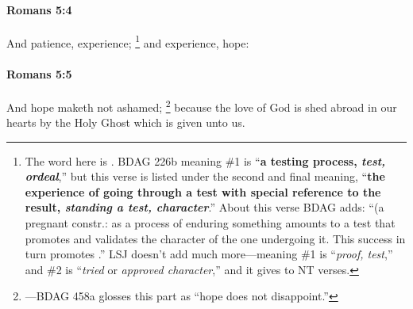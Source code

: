 		\paragraph{Romans 5:4} %
			\label{ROMANS-5-4}

			And patience, experience;%
				\footnote{%
					The word here is . BDAG 226b meaning \#1 is ``\textbf{a testing process, \textit{test, ordeal}},'' but this verse is listed under the second and final meaning, ``\textbf{the experience of going through a test with special reference to the result, \textit{standing a test, character}}.'' About this verse BDAG adds: ``(a pregnant constr.:  as a process of enduring something amounts to a test that promotes and validates the character of the one undergoing it. This success in turn promotes .'' LSJ doesn't add much more---meaning \#1 is ``\textit{proof, test},'' and \#2 is ``\textit{tried} or \textit{approved character},'' and it gives to NT verses.
					}
			and experience, hope:

			\begin{framed}
			\scriptsize
				\begin{compactdesc}
					\item[SBLG] 
				\end{compactdesc}
			\end{framed}

		\paragraph{Romans 5:5} %
			\label{ROMANS-5-5}

			And hope maketh not ashamed;%
				\footnote{%
					---BDAG 458a glosses this part as ``hope does not disappoint.'' 
					}
			because the love of God is shed abroad in our hearts by the Holy Ghost which is given unto us.

